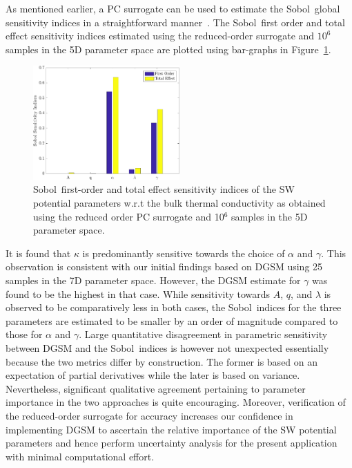 As mentioned earlier, a PC surrogate can be used to estimate the Sobol\textquotesingle~global sensitivity indices in a 
straightforward manner~\cite{Sudret:2008}. The Sobol\textquotesingle~first order and total effect sensitivity indices estimated
using the reduced-order surrogate and $10^{6}$ samples in the 5D parameter space are plotted using bar-graphs in
Figure~\ref{fig:gsa}. 

\begin{figure}[htbp]
 \begin{center}
  \includegraphics[width=0.5\textwidth]{./Figures/PCE5D_gsa}
\caption{Sobol\textquotesingle~first-order and total effect sensitivity indices of the SW potential parameters
w.r.t the bulk thermal
conductivity as obtained using the reduced order PC surrogate and 10$^{6}$ samples in the 5D parameter space. }
\label{fig:gsa}
\end{center}
\end{figure}

It is found that $\kappa$ is predominantly sensitive towards the choice of $\alpha$ and
$\gamma$. This observation is consistent with our initial findings based on DGSM using 25 samples in the 7D
parameter space. However, the DGSM estimate for $\gamma$ was found to be the highest in that case. 
While sensitivity towards $A$, $q$, and $\lambda$ is observed to be comparatively less in both cases, the 
Sobol\textquotesingle~indices for the three parameters are estimated to be smaller by an order of magnitude
 compared to those
for $\alpha$ and $\gamma$. Large quantitative disagreement in parametric sensitivity between DGSM and the 
Sobol\textquotesingle~indices is however not unexpected essentially because the two metrics differ by construction.
The former is based
on an expectation of partial derivatives while the later is based on variance. Nevertheless, significant qualitative
agreement pertaining to parameter importance in the two approaches is quite encouraging. 
Moreover, verification of the reduced-order
surrogate for accuracy increases our confidence in implementing DGSM to ascertain the relative importance of the
SW potential parameters and hence perform uncertainty analysis for the present application with minimal
computational effort. 


























